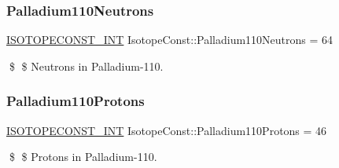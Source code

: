 \subsubsection{\texorpdfstring{Palladium110\+Neutrons}{Palladium110Neutrons}}
{\footnotesize\ttfamily \mbox{\hyperlink{group___isotope_const-_macros_ga5f18360b3e99483a35c32d789e62621c}{I\+S\+O\+T\+O\+P\+E\+C\+O\+N\+S\+T\+\_\+\+I\+NT}} Isotope\+Const\+::\+Palladium110\+Neutrons = 64}

\$ \$ Neutrons in Palladium-\/110. \mbox{\label{group___isotope_const-_palladium-_pd110_gab424a3944eda1a1bace1bac28e08362d}} 
\subsubsection{\texorpdfstring{Palladium110\+Protons}{Palladium110Protons}}
{\footnotesize\ttfamily \mbox{\hyperlink{group___isotope_const-_macros_ga5f18360b3e99483a35c32d789e62621c}{I\+S\+O\+T\+O\+P\+E\+C\+O\+N\+S\+T\+\_\+\+I\+NT}} Isotope\+Const\+::\+Palladium110\+Protons = 46}

\$ \$ Protons in Palladium-\/110. 